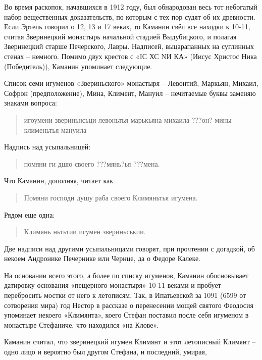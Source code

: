 
Во время раскопок, начавшихся в 1912 году, был обнародован весь тот небогатый набор вещественных доказательств, по которым с тех пор судят об их древности. Если Эртель говорил о 12, 13 и 17 веках, то Каманин свёл все находки к 10-11, считая Зверинецкий монастырь начальной стадией Выдубицкого, и полагая Зверинецкий старше Печерского, Лавры. Надписей, выцарапанных на суглинных стенах – немного. Помимо двух крестов с «IС ХС NИ КА» (Иисус Христос Ника (Победитель)), Каманин упоминает следующие.

Список семи игуменов «Звериньского» монастыря – Левонтий, Маркьян, Михаил, Софрон (предположение), Мина, Климент, Мануил – нечитаемые буквы заменяю знаками вопроса: 

\begin{quotation}
игоумени звериньнсьци левоньтья марькьяна михаила ???он? мины клименьтья мануила\end{quotation}

Надпись над усыпальницей: 

\begin{quotation}
помяни ги дшю своего ???мянь?ья ???мена.\end{quotation}

Что Каманин, дополняя, читает как 

\begin{quotation}
Помяни господи душу раба своего Климяньтья игумена.
\end{quotation}

Рядом еще одна: 

\begin{quotation}
Климянь ньтьтии игумен звериньськии.\end{quotation}

Две надписи над другими усыпальницами говорят, при прочтении с догадкой, об некоем Андронике Печернике или Чернце, да о Федоре Калеке.

На основании всего этого, а более по списку игуменов, Каманин обосновывает датировку основания «пещерного монастыря» 10-11 веками и пробует перебросить мостки от него к летописям. Так, в Ипатьевской за 1091 (6599 от сотворения мира) год Нестор в рассказе о перенесении мощей святого Феодосия упоминает некоего «Климянта», коего Стефан поставил после себя игуменом в монастыре Стефаниче, что находился «на Клове».

Каманин считал, что зверинецкий игумен Климянт и этот летописный Климянт – одно лицо и вероятно был другом Стефана, и последний, умирая, 

